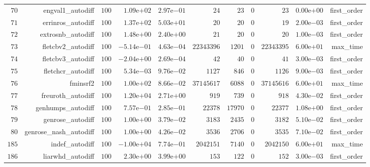 \documentclass[varwidth=20cm,crop=true]{standalone}
\begin{document}
\begin{longtable}{rrrrrrrrrrr}
  \(    70\) & engval1\_autodiff & \(   100\) & \( 1.09\)e\(+02\) & \( 2.97\)e\(-01\) & \(    24\) & \(    23\) & \(     0\) & \(    23\) & \( 0.00\)e\(+00\) & first\_order \\
  \(    71\) & errinros\_autodiff & \(   100\) & \( 1.37\)e\(+02\) & \( 5.03\)e\(+01\) & \(    20\) & \(    20\) & \(     0\) & \(    19\) & \( 2.00\)e\(-03\) & first\_order \\
  \(    72\) & extrosnb\_autodiff & \(   100\) & \( 1.48\)e\(+00\) & \( 2.40\)e\(+00\) & \(    21\) & \(    20\) & \(     0\) & \(    20\) & \( 1.00\)e\(-03\) & first\_order \\
  \(    73\) & fletcbv2\_autodiff & \(   100\) & \(-5.14\)e\(-01\) & \( 4.63\)e\(-04\) & \(22343396\) & \(  1201\) & \(     0\) & \(22343395\) & \( 6.00\)e\(+01\) & max\_time \\
  \(    74\) & fletcbv3\_autodiff & \(   100\) & \(-2.04\)e\(+00\) & \( 2.69\)e\(-04\) & \(    42\) & \(    40\) & \(     0\) & \(    41\) & \( 3.00\)e\(-03\) & first\_order \\
  \(    75\) & fletchcr\_autodiff & \(   100\) & \( 5.34\)e\(-03\) & \( 9.76\)e\(-02\) & \(  1127\) & \(   846\) & \(     0\) & \(  1126\) & \( 9.00\)e\(-03\) & first\_order \\
  \(    76\) & fminsrf2 & \(   100\) & \( 1.00\)e\(+02\) & \( 8.66\)e\(-02\) & \(37145617\) & \(  6088\) & \(     0\) & \(37145616\) & \( 6.00\)e\(+01\) & max\_time \\
  \(    77\) & freuroth\_autodiff & \(   100\) & \( 1.20\)e\(+04\) & \( 2.71\)e\(+00\) & \(   919\) & \(   739\) & \(     0\) & \(   918\) & \( 4.30\)e\(-02\) & first\_order \\
  \(    78\) & genhumps\_autodiff & \(   100\) & \( 7.57\)e\(-01\) & \( 2.85\)e\(-01\) & \( 22378\) & \( 17970\) & \(     0\) & \( 22377\) & \( 1.08\)e\(+00\) & first\_order \\
  \(    79\) & genrose\_autodiff & \(   100\) & \( 1.00\)e\(+00\) & \( 3.79\)e\(-02\) & \(  3183\) & \(  2435\) & \(     0\) & \(  3182\) & \( 5.10\)e\(-02\) & first\_order \\
  \(    80\) & genrose\_nash\_autodiff & \(   100\) & \( 1.00\)e\(+00\) & \( 4.26\)e\(-02\) & \(  3536\) & \(  2706\) & \(     0\) & \(  3535\) & \( 7.10\)e\(-02\) & first\_order \\
  \(   185\) & indef\_autodiff & \(   100\) & \(-1.00\)e\(+04\) & \( 7.74\)e\(-01\) & \(2042151\) & \(  7140\) & \(     0\) & \(2042150\) & \( 6.00\)e\(+01\) & max\_time \\
  \(   186\) & liarwhd\_autodiff & \(   100\) & \( 2.30\)e\(+00\) & \( 3.99\)e\(+00\) & \(   153\) & \(   122\) & \(     0\) & \(   152\) & \( 3.00\)e\(-03\) & first\_order \\

\end{longtable}
\end{document}
